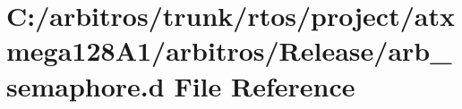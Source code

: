 \hypertarget{rtos_2project_2atxmega128_a1_2arbitros_2_release_2arb__semaphore_8d}{\section{C\-:/arbitros/trunk/rtos/project/atxmega128\-A1/arbitros/\-Release/arb\-\_\-semaphore.d File Reference}
\label{rtos_2project_2atxmega128_a1_2arbitros_2_release_2arb__semaphore_8d}
}
